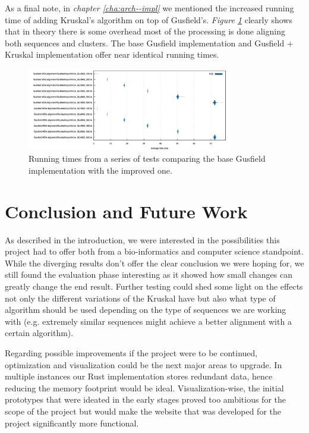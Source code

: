 \documentclass[twoside,openright,titlepage,numbers=noenddot,headinclude,%
                footinclude=true,cleardoublepage=empty,abstractoff, %
                BCOR=5mm,paper=a4,fontsize=11pt,%
                ngerman,american,%
                ]{scrreprt}
\begin{document}
As a final note, in \textit{chapter \ref{cha:arch--impl}} we mentioned the increased running time of adding Kruskal's algorithm on top of Gusfield's. \textit{Figure \ref{fig:running-times}} clearly shows that in theory there is some overhead most of the processing is done aligning both sequences and clusters. The base Gusfield implementation and Gusfield + Kruskal implementation offer near identical running times.

\begin{figure}[h]
\includegraphics[width=0.8\textwidth]{runing-times.png}
\centering
\caption{Running times from a series of tests comparing the base Gusfield implementation with the improved one.}
\label{fig:running-times}
\end{figure}

\section{Conclusion and Future Work}
As described in the introduction, we were interested in the possibilities this project had to offer both from a bio-informatics and computer science standpoint. While the diverging results don't offer the clear conclusion we were hoping for, we still found the evaluation phase interesting as it showed how small changes can greatly change the end result. Further testing could shed some light on the effects not only the different variations of the Kruskal have but also what type of algorithm should be used depending on the type of sequences we are working with (e.g. extremely similar sequences might achieve a better alignment with a certain algorithm).

Regarding possible improvements if the project were to be continued, optimization and visualization could be the next major areas to upgrade. In multiple instances our Rust implementation stores redundant data, hence reducing the memory footprint would be ideal. Visualization-wise, the initial prototypes that were ideated in the early stages proved too ambitious for the scope of the project but would make the website that was developed for the project significantly more functional. 
\end{document}
